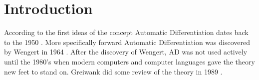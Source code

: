 \chapter{Introduction}
According to \emph{\citep{SurveyAD}} the first ideas of the concept Automatic Differentiation dates back to the 1950 \emph{\citep{beda1959programs}}. More specifically forward Automatic Differentiation was discovered by Wengert in 1964 \emph{\citep{wengert1964simple}}. After the discovery of Wengert, AD was not used actively until the 1980's when modern computers and computer languages gave the theory new feet to stand on. Greiwank did some review of the theory in 1989 \emph{\citep{griewank1989automatic}}.
\listoftodos
